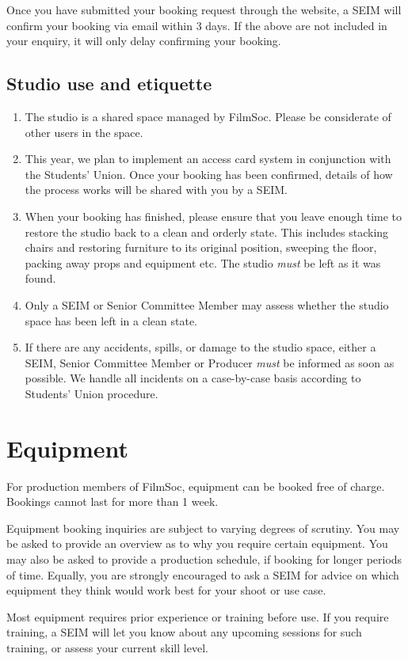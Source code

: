 \documentclass[]{article}
\begin{document}
Once you have submitted your booking request through the website, a SEIM will confirm your booking via email within 3 days. If the above are not included in your enquiry, it will only delay confirming your booking.
\subsection{Studio use and etiquette}
\begin{enumerate}
    \item The studio is a shared space managed by FilmSoc. Please be considerate of other users in the space.
    \item This year, we plan to implement an access card system in conjunction with the Students' Union. Once your booking has been confirmed, details of how the process works will be shared with you by a SEIM.
    \item When your booking has finished, please ensure that you leave enough time to restore the studio back to a clean and orderly state. This includes stacking chairs and restoring furniture to its original position, sweeping the floor, packing away props and equipment etc. The studio \textit{must} be left as it was found.
    \item Only a SEIM or Senior Committee Member may assess whether the studio space has been left in a clean state.
    \item If there are any accidents, spills, or damage to the studio space, either a SEIM, Senior Committee Member or Producer \textit{must} be informed as soon as possible. We handle all incidents on a case-by-case basis according to Students' Union procedure.
\end{enumerate}
\section{Equipment}\label{equipment}
For production members of FilmSoc, equipment can be booked free of charge. Bookings cannot last for more than 1 week.

Equipment booking inquiries are subject to varying degrees of scrutiny. You may be asked to provide an overview as to why you require certain equipment. You may also be asked to provide a production schedule, if booking for longer periods of time. Equally, you are strongly encouraged to ask a SEIM for advice on which equipment they think would work best for your shoot or use case. 

Most equipment requires prior experience or training before use. If you require training, a SEIM will let you know about any upcoming sessions for such training, or assess your current skill level.
\end{document}
